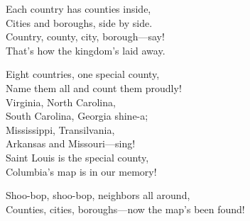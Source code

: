 \begin{lyrics}
Each country has counties inside,\\
Cities and boroughs, side by side.\\
Country, county, city, borough—say!\\
That’s how the kingdom’s laid away.

Eight countries, one special county,\\
Name them all and count them proudly!\\
Virginia, North Carolina,\\
South Carolina, Georgia shine-a;\\
Mississippi, Transilvania,\\
Arkansas and Missouri—sing!\\
Saint Louis is the special county,\\
Columbia’s map is in our memory!

Shoo-bop, shoo-bop, neighbors all around,\\
Counties, cities, boroughs—now the map’s been found!
\end{lyrics}

